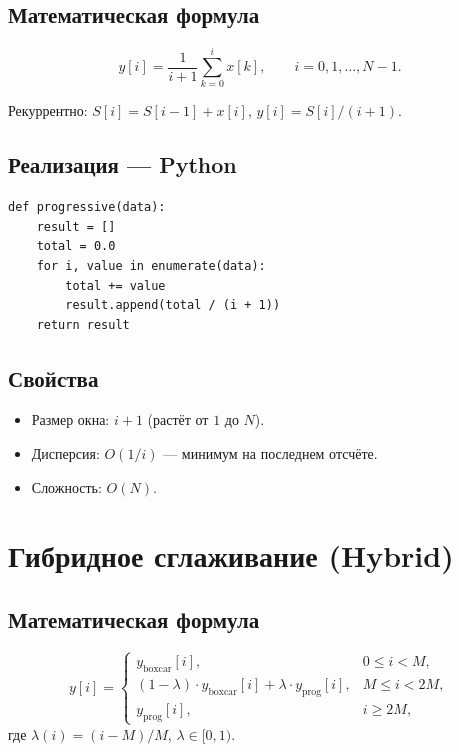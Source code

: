 \documentclass[12pt,a4paper]{article}
\begin{document}
\subsection{Математическая формула}

\[
y[i] = \frac{1}{i + 1} \sum_{k=0}^{i} x[k], \qquad i = 0, 1, \ldots, N{-}1.
\]

Рекуррентно: $S[i] = S[i{-}1] + x[i]$, \quad $y[i] = S[i] \big/ (i + 1)$.

\subsection{Реализация --- Python}

\begin{lstlisting}
def progressive(data):
    result = []
    total = 0.0
    for i, value in enumerate(data):
        total += value
        result.append(total / (i + 1))
    return result
\end{lstlisting}

\subsection{Свойства}

\begin{itemize}
  \item Размер окна: $i + 1$ (растёт от $1$ до $N$).
  \item Дисперсия: $O(1/i)$ --- минимум на последнем отсчёте.
  \item Сложность: $O(N)$.
\end{itemize}

\section{Гибридное сглаживание (Hybrid)}

\subsection{Математическая формула}

\[
y[i] =
\begin{cases}
y_{\text{boxcar}}[i], & 0 \leq i < M, \\[4pt]
(1 - \lambda) \cdot y_{\text{boxcar}}[i] + \lambda \cdot y_{\text{prog}}[i], & M \leq i < 2M, \\[4pt]
y_{\text{prog}}[i], & i \geq 2M,
\end{cases}
\]
где $\lambda(i) = (i - M) / M$, \quad $\lambda \in [0, 1)$.
\end{document}
